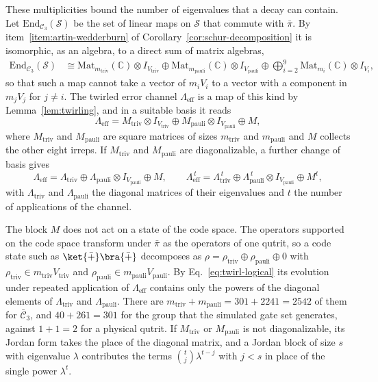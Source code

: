 These multiplicities bound the number of eigenvalues that a decay can contain. Let $\mathrm{End}_{\mathcal{C}_3}(\mathcal{S})$ be the set of linear maps on $\mathcal{S}$ that commute with $\bar\pi$. By item~\ref{item:artin-wedderburn} of Corollary~\ref{cor:schur-decomposition} it is isomorphic, as an algebra, to a direct sum of matrix algebras,
\begin{align}
    \mathrm{End}_{\mathcal{C}_3}(\mathcal{S}) &\cong \mathrm{Mat}_{m_{\mathrm{triv}}}(\mathbb{C}) \otimes I_{V_{\mathrm{triv}}} \oplus \mathrm{Mat}_{m_{\mathrm{pauli}}}(\mathbb{C})\otimes I_{V_{\mathrm{pauli}}} \oplus \bigoplus_{i = 2}^9 \mathrm{Mat}_{m_i} (\mathbb{C}) \otimes I_{V_i} ,
\end{align}
so that such a map cannot take a vector of $m_i V_i$ to a vector with a component in $m_j V_j$ for $j \neq i$. The twirled error channel $\Lambda_{\mathrm{eff}}$ is a map of this kind by Lemma~\ref{lem:twirling}, and in a suitable basis it reads
\begin{equation}
    \Lambda_{\mathrm{eff}} = M_{\mathrm{triv}}\otimes I_{V_{\mathrm{triv}}} \oplus M_{\mathrm{pauli}} \otimes I_{V_{\mathrm{pauli}}} \oplus M ,
\end{equation}
where $M_{\mathrm{triv}}$ and $M_{\mathrm{pauli}}$ are square matrices of sizes $m_{\mathrm{triv}}$ and $m_{\mathrm{pauli}}$ and $M$ collects the other eight irreps. If $M_{\mathrm{triv}}$ and $M_{\mathrm{pauli}}$ are diagonalizable, a further change of basis gives
\begin{equation}
    \Lambda_{\mathrm{eff}} = \Lambda_{\mathrm{triv}} \oplus \Lambda_{\mathrm{pauli}} \otimes I_{V_{\mathrm{pauli}}} \oplus M ,
    \qquad
    \Lambda_{\mathrm{eff}}^{\,t} = \Lambda_{\mathrm{triv}}^{\,t} \oplus \Lambda_{\mathrm{pauli}}^{\,t} \otimes I_{V_{\mathrm{pauli}}} \oplus M^{t} ,
    \label{eq:twirl-logical}
\end{equation}
with $\Lambda_{\mathrm{triv}}$ and $\Lambda_{\mathrm{pauli}}$ the diagonal matrices of their eigenvalues and $t$ the number of applications of the channel.

The block $M$ does not act on a state of the code space. The operators supported on the code space transform under $\bar\pi$ as the operators of one qutrit, so a code state such as $\ket{\bar{+}}\bra{\bar{+}}$ decomposes as $\rho = \rho_{\mathrm{triv}} \oplus \rho_{\mathrm{pauli}} \oplus 0$ with $\rho_{\mathrm{triv}} \in m_{\mathrm{triv}} V_{\mathrm{triv}}$ and $\rho_{\mathrm{pauli}} \in m_{\mathrm{pauli}}V_{\mathrm{pauli}}$. By Eq.~\eqref{eq:twirl-logical} its evolution under repeated application of $\Lambda_{\mathrm{eff}}$ contains only the powers of the diagonal elements of $\Lambda_{\mathrm{triv}}$ and $\Lambda_{\mathrm{pauli}}$. There are $m_{\mathrm{triv}} + m_{\mathrm{pauli}} = 301 + 2241 = 2542$ of them for $\bar{\mathcal{C}}_3$, and $40 + 261 = 301$ for the group that the simulated gate set generates, against $1 + 1 = 2$ for a physical qutrit. If $M_{\mathrm{triv}}$ or $M_{\mathrm{pauli}}$ is not diagonalizable, its Jordan form takes the place of the diagonal matrix, and a Jordan block of size $s$ with eigenvalue $\lambda$ contributes the terms $\binom{t}{j}\lambda^{t-j}$ with $j < s$ in place of the single power $\lambda^t$.
